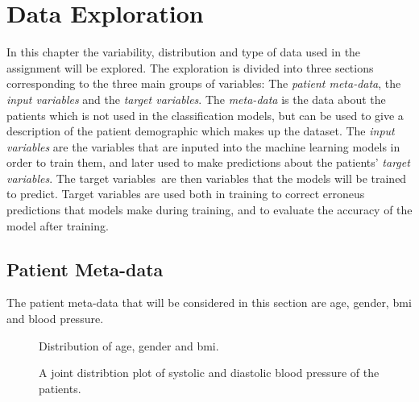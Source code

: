 \chapter{Data Exploration} \label{chap:data}

In this chapter the variability, distribution and type of data used in the assignment will be explored. The exploration is divided into three sections corresponding to the three main groups of variables: The \textit{patient meta-data}, the \textit{input variables} and the \textit{target variables}. The \textit{meta-data} is the data about the patients which is not used in the classification models, but can be used to give a description of the patient demographic which makes up the dataset. The \textit{input variables} are the variables that are inputed into the machine learning models in order to train them, and later used to make predictions about the patients' \textit{target variables}. The target variables are then variables that the models will be trained to predict. Target variables are used both in training to correct erroneus predictions that models make during training, and to evaluate the accuracy of the model after training. \bigskip

\section{Patient Meta-data} \label{sec:metadata}
The patient meta-data that will be considered in this section are age, gender, \acrfull{bmi} and blood pressure.

\begin{figure}
    \centering
    
    \caption{Distribution of age, gender and \acrshort{bmi}.}
    \label{fig:meta_dist4}
\end{figure}

\begin{figure}
    \centering
    
    \caption{A joint distribtion plot of systolic and diastolic blood pressure of the patients.}
    \label{fig:bp_dist}
\end{figure}

